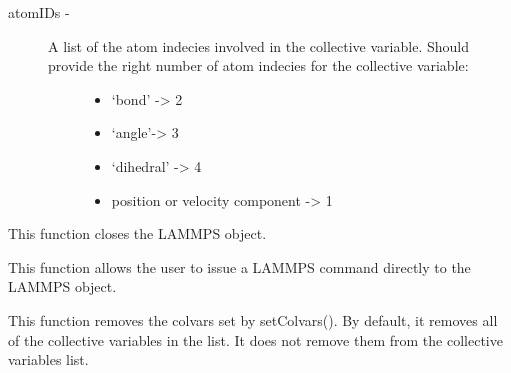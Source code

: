 \documentclass[letterpaper,10pt,english]{sphinxmanual}
\begin{document}
\begin{fulllineitems}
\begin{fulllineitems}
\begin{description}
\begin{description}
\begin{itemize}
\end{itemize}

\end{description}

\item[{atomIDs - }] \leavevmode\begin{description}
\item[{A list of the atom indecies involved in the collective variable. Should provide the right number of atom indecies for the collective variable:}] \leavevmode\begin{itemize}
\item {} 
`bond' -\textgreater{} 2

\item {} 
`angle'-\textgreater{} 3

\item {} 
`dihedral' -\textgreater{} 4

\item {} 
position or velocity component -\textgreater{} 1

\end{itemize}

\end{description}

\end{description}

\end{fulllineitems}


\begin{fulllineitems}
\label{walker_api/walker_api.doc:lammpsWalker.lammpsWalker.close}
This function closes the LAMMPS object.

\end{fulllineitems}


\begin{fulllineitems}
\label{walker_api/walker_api.doc:lammpsWalker.lammpsWalker.command}
This function allows the user to issue a LAMMPS command directly to the
LAMMPS object.

\end{fulllineitems}


\begin{fulllineitems}
\label{walker_api/walker_api.doc:lammpsWalker.lammpsWalker.destroyColvars}
This function removes the colvars set by setColvars(). By default, it removes all of the collective variables in the list. It does not remove them from the collective variables list.


\end{fulllineitems}
\end{fulllineitems}
\end{document}

